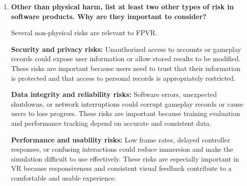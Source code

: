 \documentclass{article}
\begin{document}
\begin{enumerate}
    The Hazard Analysis encouraged us to examine additional
    scenarios, including loss of VR tracking, invalid controller
    inputs, unexpected hardware disconnections, network
    interruptions, unauthorized access to gameplay records,
    and corruption or loss of saved progress. Some of these
    risks may have been recognized informally earlier, but
    the analysis helped us identify their causes and consequences
    more explicitly.

    These risks emerged by examining each system component
    and considering what could happen if it failed, received
    invalid data, or interacted incorrectly with another
    component. For example, examining controller inputs
    highlighted the possibility of unexpected drone movements.
    Examining multiplayer communication raised concerns about
    manipulated messages and inconsistent gameplay states.
    Finally, examining data storage highlighted the possibility
    of unauthorized access and the loss of saved records.
    This process demonstrated that risks extend beyond the
    simulation itself to include network communication,
    user information, and the reliability of stored data.

    \item \textbf{Other than physical harm, list at least two
    other types of risk in software products. Why are they
    important to consider?}

    Several non-physical risks are relevant to FPVR.

    \textbf{Security and privacy risks:}
    Unauthorized access to accounts or gameplay records could
    expose user information or allow stored results to be
    modified. These risks are important because users need
    to trust that their information is protected and that
    access to personal records is appropriately restricted.

    \textbf{Data integrity and reliability risks:}
    Software errors, unexpected shutdowns, or network
    interruptions could corrupt gameplay records or cause
    users to lose progress. These risks are important because
    training evaluation and performance tracking depend on
    accurate and consistent data.

    \textbf{Performance and usability risks:}
    Low frame rates, delayed controller responses, or confusing
    interactions could reduce immersion and make the simulation
    difficult to use effectively. These risks are especially
    important in VR because responsiveness and consistent
    visual feedback contribute to a comfortable and usable
    experience.


\end{enumerate}
\end{document}
